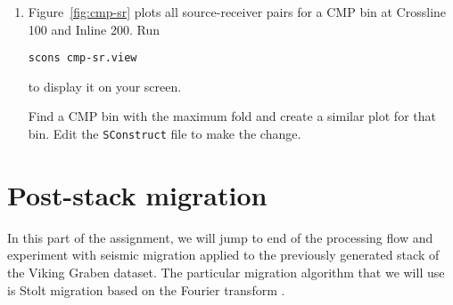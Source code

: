 \begin{enumerate}
\item Figure~\ref{fig:cmp-sr} plots all source-receiver pairs for a CMP bin at Crossline 100 and Inline 200. Run
\begin{verbatim}
scons cmp-sr.view 
\end{verbatim}
to display it on your screen. 


Find a CMP bin with the maximum fold and create a similar plot for that bin. Edit the \texttt{SConstruct} file to make the change.

\end{enumerate}

\lstset{language=python,numbers=left,numberstyle=\tiny,showstringspaces=false}


\section{Post-stack migration}

In this part of the assignment, we will jump to end of the processing flow and experiment with seismic migration applied to the previously generated stack of the Viking Graben dataset. The particular migration algorithm that we will use is Stolt migration based on the Fourier transform \cite[]{GEO50-11-22192244}.

